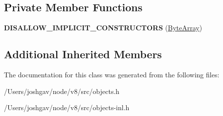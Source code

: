 \subsection*{Private Member Functions}
\begin{DoxyCompactItemize}
\item 
{\bfseries D\+I\+S\+A\+L\+L\+O\+W\+\_\+\+I\+M\+P\+L\+I\+C\+I\+T\+\_\+\+C\+O\+N\+S\+T\+R\+U\+C\+T\+O\+RS} (\hyperlink{classv8_1_1internal_1_1_byte_array}{Byte\+Array})\hypertarget{classv8_1_1internal_1_1_byte_array_adf32b9dacd0289a9d381512a923d35fc}{}\label{classv8_1_1internal_1_1_byte_array_adf32b9dacd0289a9d381512a923d35fc}

\end{DoxyCompactItemize}
\subsection*{Additional Inherited Members}


The documentation for this class was generated from the following files\+:\begin{DoxyCompactItemize}
\item 
/\+Users/joshgav/node/v8/src/objects.\+h\item 
/\+Users/joshgav/node/v8/src/objects-\/inl.\+h\end{DoxyCompactItemize}
